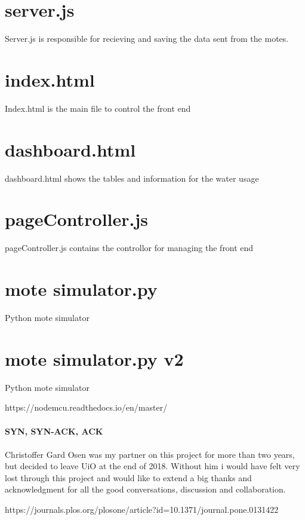 \documentclass[]{uiophd}
\begin{document}
\section{server.js}
Server.js is responsible for recieving and saving the data sent from the motes.


\section{index.html}
Index.html is the main file to control the front end


\section{dashboard.html}
dashboard.html shows the tables and information for the water usage


\section{pageController.js}
pageController.js contains the controllor for managing the front end


\section{mote simulator.py}
Python mote simulator


\section{mote simulator.py v2}
Python mote simulator


https://nodemcu.readthedocs.io/en/master/
\\\\
\textbf{SYN, SYN-ACK, ACK}
\\\\
Christoffer Gard Osen was my partner on this project for more than two years, but decided to leave UiO at the end of 2018. Without him i would have felt very lost through this project and would like to extend a big thanks and acknowledgment for all the good conversations, discussion and collaboration.



https://journals.plos.org/plosone/article?id=10.1371/journal.pone.0131422
\end{document}
